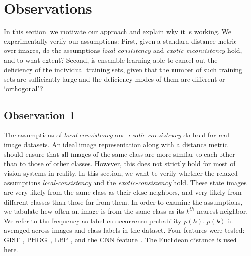 




\section{Observations}
\label{en:sec:observations}

\label{en:sec:observation} In this section, we motivate our approach and explain why it is
working. We experimentally verify our assumptions: First, given a
standard distance metric over images, do the assumptions
\emph{local-con\-sist\-ency} and \emph{exotic-incon\-sistency}
hold, and to what extent? Second, is ensemble learning able to cancel
out the deficiency of the individual training sets, given that the
number of such training sets are sufficiently large and the deficiency
modes of them are different or `orthogonal'?

\subsection{Observation 1}
\label{en:sec:mov1}
The assumptions of \emph{local-consistency} and
\emph{exotic-consist\-ency} do hold for real image datasets.  An
ideal image representation along with a distance metric should ensure
that all images of the same class are more similar to each other
than to those of other classes. However, this does not strictly hold for
most of vision systems in reality. In this section, we want to verify
whether the relaxed assumptions 
\emph{local-consistency} and the \emph{exotic-consistency} hold. 
These state images are very likely from the same class as their close
neighbors, and very likely from different classes than those far from them. 
In order to examine the assumptions, we tabulate how often an
image is from the same class as its $k^{th}$-nearest neighbor.  We
refer to the frequency as label co-occurrence probability $p(k)$.
$p(k)$ is averaged across images and class labels in the dataset. Four
features were tested: GIST \citep{gist}, PHOG~\citep{phog},
LBP \citep{lbp}, and the CNN feature~\citep{deep:bmvc14}. 
The Euclidean distance is used here.

